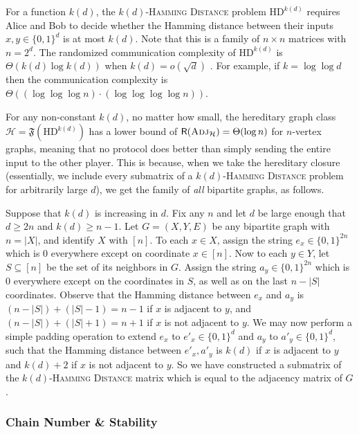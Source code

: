 \documentclass{theoretics}
\newcommand{\zo}{\{0,1\}}
\newcommand{\cH}{\ensuremath{\mathcal{H}}}
\newcommand{\Adj}{\textsc{Adj}}
\newcommand{\CC}{\mathsf{R}}
\begin{document}
\begin{example}
\label{example:hamming distance}
For a function $k(d)$, the \textsc{$k(d)$-Hamming Distance} problem $\mathrm{HD}^{k(d)}$ requires
Alice and Bob to decide whether the Hamming distance between their inputs $x,y \in \zo^d$ is at most
$k(d)$. Note that this is a family of $n \times n$ matrices with $n = 2^d$. The randomized
communication complexity of $\mathrm{HD}^{k(d)}$ is $\Theta(k(d) \log k(d))$ when $k(d) = o(\sqrt d)$ \cite{HSZZ06,Sag18}.
For example, if $k = \log \log d$ then the communication complexity is $\Theta( (\log\log\log n)
\cdot(\log\log\log\log n))$.

For any non-constant $k(d)$, no matter how small, the hereditary graph class $\cH =
\mathfrak{F}(\mathrm{HD}^{k(d)})$ has a lower bound of $\CC(\Adj_\cH) = \Theta(\log n)$ for
$n$-vertex graphs, meaning that no protocol does better than simply sending the entire input to the
other player. This is because, when we take the hereditary closure (essentially, we include every
submatrix of a \textsc{$k(d)$-Hamming Distance} problem for arbitrarily large $d$), we get the
family of \emph{all} bipartite graphs, as follows.

Suppose that $k(d)$ is increasing in $d$. Fix any $n$ and let $d$ be large enough that $d \geq 2n$
and $k(d) \geq n-1$.  Let $G = (X,Y,E)$ be any bipartite graph with $n = |X|$, and identify $X$ with
$[n]$. To each $x \in X$, assign the string $e_x \in \zo^{2n}$ which is 0 everywhere except on
coordinate $x \in [n]$. Now to each $y \in Y$, let $S \subseteq [n]$ be the set of its neighbors in
$G$. Assign the string $a_y \in \zo^{2n}$ which is 0 everywhere except on the coordinates in $S$, as
well as on the last $n-|S|$ coordinates. Observe that the Hamming distance between $e_x$ and $a_y$
is $(n-|S|)+(|S|-1) = n-1$ if $x$ is adjacent to $y$, and $(n-|S|) + (|S|+1) = n+1$ if $x$ is not
adjacent to $y$. We may now perform a simple padding operation to extend $e_x$ to $e'_x \in \zo^d$
and $a_y$ to $a'_y \in \zo^d$, such that the Hamming distance between $e'_x, a'_y$ is $k(d)$ if $x$
is adjacent to $y$ and $k(d) + 2$ if $x$ is not adjacent to $y$. So we have constructed a submatrix
of the \textsc{$k(d)$-Hamming Distance} matrix which is equal to the adjacency matrix of $G$.
\end{example}

\subsubsection{Chain Number \& Stability}
\end{document}
